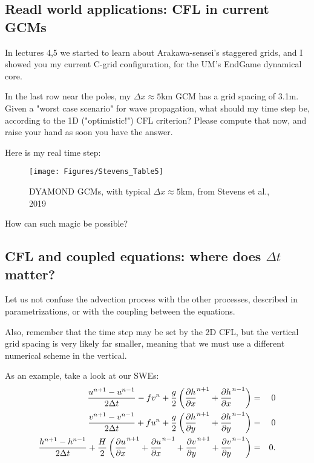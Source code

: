 \subsection{Readl world applications: CFL in current GCMs}
	
	In lectures 4,5 we started to learn about Arakawa-sensei's staggered grids, and I showed you my current C-grid configuration, for the UM's EndGame dynamical core. \\
	
	\medskip
	
	In the last row near the poles, my $\Delta x \approx 5$km GCM has a grid spacing of 3.1m. Given a "worst case scenario" for wave propagation, what should my time step be, according to the 1D ("optimistic!") CFL criterion? Please compute that now, and raise your hand as soon you have the answer.\\
	
	\medskip
	
	Here is my real time step: 
	
	\begin{figure}
		\texttt{[image: Figures/Stevens\_Table5]}
		\tiny{\caption{DYAMOND GCMs, with typical $\Delta x \approx 5$km, from Stevens et al., 2019}}
	\end{figure}
	
	
	How can such magic be possible?
	

\subsection{CFL and coupled equations: where does $\Delta t$ matter?}

	Let us not confuse the advection process with the other processes, described in parametrizations, or with the coupling between the equations. 
	
	Also, remember that the time step may be set by the 2D CFL, but the vertical grid spacing is very likely far smaller, meaning that we must use a different numerical scheme in the vertical.
	
	As an example, take a look at our SWEs:
	\begin{eqnarray*}
		\frac{u^{n+1}-u^{n-1}}{2\Delta t}-fv^n+\frac{g}{2}
		\left( \frac{\partial h}{\partial x}^{n+1} +\frac{\partial h}{\partial x}^{n-1} \right) & = & 0 \\
		\frac{v^{n+1}-v^{n-1}}{2\Delta t}+fu^n+\frac{g}{2}
		\left( \frac{\partial h}{\partial y}^{n+1} +\frac{\partial h}{\partial y}^{n-1} \right) & = & 0 \\
		\frac{h^{n+1}-h^{n-1}}{2\Delta t}+\frac{H}{2}
		\left( \frac{\partial u}{\partial x}^{n+1} +\frac{\partial u}{\partial x}^{n-1}
		+\frac{\partial v}{\partial y}^{n+1} +\frac{\partial v}{\partial y}^{n-1} 
		\right) & = & 0. 
	\end{eqnarray*}

